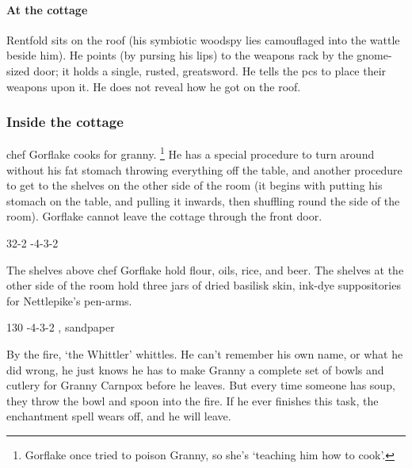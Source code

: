 \documentclass[10pt,twoside]{book}
\begin{document}
\paragraph{At the cottage}
Rentfold sits on the roof (his symbiotic \gls{woodspy} lies camouflaged into the wattle beside him).
He points (by pursing his lips) to the weapons rack by the gnome-sized door; it holds a single, rusted, greatsword.
He tells the \glspl{pc} to place their weapons upon it.
He does not reveal how he got on the roof.

\subsubsection{Inside the cottage}
chef Gorflake cooks for granny.%
\footnote{Gorflake once tried to poison Granny, so she's `teaching him how to cook'.}
He has a special procedure to turn around without his fat stomach throwing everything off the table, and another procedure to get to the shelves on the other side of the room (it begins with putting his stomach on the table, and pulling it inwards, then shuffling round the side of the room).
Gorflake cannot leave the cottage through the front door.

%
  {{3}{2}{-2}}%
  {{-4}{-3}{-2}}%
  {%
  }%
  {}%
  {}%
  {}%

The shelves above chef Gorflake hold flour, oils, rice, and beer.
The shelves at the other side of the room hold three jars of dried \gls{basilisk} skin, ink-dye suppositories for Nettlepike's pen-arms.

%
  {{1}{3}{0}}%
  {{-4}{-3}{-2}}%
  {%
    \Dagger
  }%
  {, \weaponmaster}%
  {sandpaper}%
  {}%

By the fire, `the Whittler' whittles.%
He can't remember his own name, or what he did wrong, he just knows he has to make Granny a complete set of bowls and cutlery for Granny Carnpox before he leaves.
But every time someone has soup, they throw the bowl and spoon into the fire.
If he ever finishes this task, the enchantment \gls{spell} wears off, and he will leave.
\end{document}
